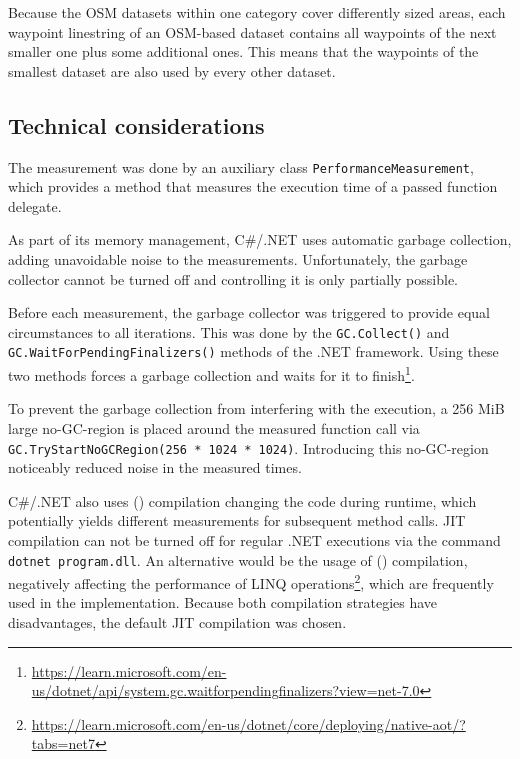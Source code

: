 		Because the OSM datasets within one category cover differently sized areas, each waypoint linestring of an OSM-based dataset contains all waypoints of the next smaller one plus some additional ones.
		This means that the waypoints of the smallest dataset are also used by every other dataset.
	
	\subsection{Technical considerations}
	
		The measurement was done by an auxiliary class \texttt{PerformanceMeasurement}, which provides a method that measures the execution time of a passed function delegate.
		
		As part of its memory management, C\#/.NET uses automatic garbage collection, adding unavoidable noise to the measurements.
		Unfortunately, the garbage collector cannot be turned off and controlling it is only partially possible.
		
		Before each measurement, the garbage collector was triggered to provide equal circumstances to all iterations.
		This was done by the \texttt{GC.Collect()} and \texttt{GC.WaitForPendingFinalizers()} methods of the .NET framework.
		Using these two methods forces a garbage collection and waits for it to finish\footnote{\url{https://learn.microsoft.com/en-us/dotnet/api/system.gc.waitforpendingfinalizers?view=net-7.0}}.
		
		To prevent the garbage collection from interfering with the execution, a 256 MiB large no-GC-region is placed around the measured function call via \texttt{GC.TryStartNoGCRegion(256 * 1024 * 1024)}.
		Introducing this no-GC-region noticeably reduced noise in the measured times.
	
		C\#/.NET also uses  () compilation changing the code during runtime, which potentially yields different measurements for subsequent method calls.
		JIT compilation can not be turned off for regular .NET executions via the command \texttt{dotnet program.dll}.
		An alternative would be the usage of  () compilation, negatively affecting the performance of LINQ operations\footnote{\url{https://learn.microsoft.com/en-us/dotnet/core/deploying/native-aot/?tabs=net7}}, which are frequently used in the implementation.
		Because both compilation strategies have disadvantages, the default JIT compilation was chosen.
		

